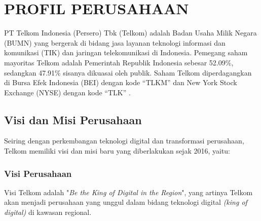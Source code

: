 \chapter{PROFIL PERUSAHAAN}
\tab PT Telkom Indonesia (Persero) Tbk (Telkom) adalah Badan Usaha Milik Negara (BUMN) yang bergerak di bidang jasa layanan teknologi informasi dan komunikasi (TIK) dan jaringan telekomunikasi di Indonesia. Pemegang saham mayoritas Telkom adalah Pemerintah Republik Indonesia sebesar 52.09\%, sedangkan 47.91\% sisanya dikuasai oleh publik. Saham Telkom diperdagangkan di Bursa Efek Indonesia (BEI) dengan kode “TLKM” dan New York Stock Exchange (NYSE) dengan kode “TLK” \cite{profil-telkom}.

\section{Visi dan Misi Perusahaan}
\tab Seiring dengan perkembangan teknologi digital dan transformasi perusahaan, Telkom memiliki visi dan misi baru yang diberlakukan sejak 2016, yaitu:
\subsection{Visi Perusahaan}
\tab Visi Telkom adalah "\textit{Be the King of Digital in the Region}", yang artinya Telkom akan menjadi perusahaan yang unggul dalam bidang teknologi digital \textit{(king of digital)} di kawasan regional.

